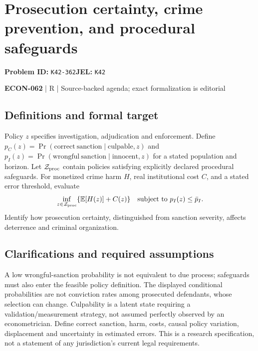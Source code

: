 \documentclass[11pt,a4paper]{article}
\begin{document}
\section*{Prosecution certainty, crime prevention, and procedural safeguards}
\textbf{Problem ID:} \texttt{K42-362}\quad \textbf{JEL:} \texttt{K42}\par
\label{problem:OP-0631}


\label{audited:ECON-062}

{\sffamily\small\color{muted}\textbf{ECON-062} | R | Source-backed agenda; exact formalization is editorial\par}

\subsection*{Definitions and formal target}

Policy \(z\) specifies investigation, adjudication and enforcement. Define \(p_C(z)=\Pr(\mathrm{correct\ sanction}\mid\mathrm{culpable},z)\) and \(p_I(z)=\Pr(\mathrm{wrongful\ sanction}\mid\mathrm{innocent},z)\) for a stated population and horizon. Let \(\mathcal Z_{\rm proc}\) contain policies satisfying explicitly declared procedural safeguards. For monetized crime harm \(H\), real institutional cost \(C\), and a stated error threshold, evaluate
\[
 \inf_{z\in\mathcal Z_{\rm proc}}\{\mathbb E[H(z)]+C(z)\}
 \quad\text{subject to }p_I(z)\leq\bar p_I .
\]
Identify how prosecution certainty, distinguished from sanction severity, affects deterrence and criminal organization.

\subsection*{Clarifications and required assumptions}

A low wrongful-sanction probability is not equivalent to due process; safeguards must also enter the feasible policy definition. The displayed conditional probabilities are not conviction rates among prosecuted defendants, whose selection can change. Culpability is a latent state requiring a validation/measurement strategy, not assumed perfectly observed by an econometrician. Define correct sanction, harm, costs, causal policy variation, displacement and uncertainty in estimated errors. This is a research specification, not a statement of any jurisdiction's current legal requirements.
\end{document}
